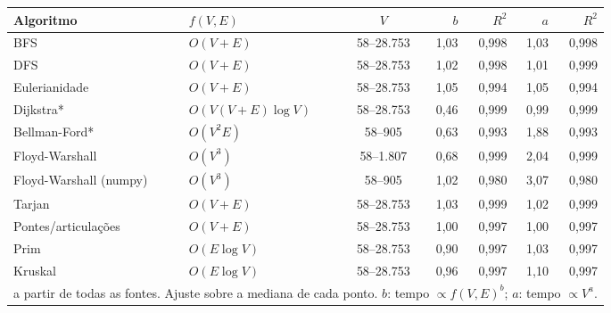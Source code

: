 \begin{tabular}{llcrrrr}
  \toprule
  Algoritmo & $f(V,E)$ & $V$ & $b$ & $R^2$ & $a$ & $R^2$ \\
  \midrule
  BFS & $O(V+E)$ & 58--28.753 & 1,03 & 0,998 & 1,03 & 0,998 \\
  DFS & $O(V+E)$ & 58--28.753 & 1,02 & 0,998 & 1,01 & 0,999 \\
  Eulerianidade & $O(V+E)$ & 58--28.753 & 1,05 & 0,994 & 1,05 & 0,994 \\
  Dijkstra* & $O(V(V+E)\log V)$ & 58--28.753 & 0,46 & 0,999 & 0,99 & 0,999 \\
  Bellman-Ford* & $O(V^2E)$ & 58--905 & 0,63 & 0,993 & 1,88 & 0,993 \\
  Floyd-Warshall & $O(V^3)$ & 58--1.807 & 0,68 & 0,999 & 2,04 & 0,999 \\
  Floyd-Warshall (numpy) & $O(V^3)$ & 58--905 & 1,02 & 0,980 & 3,07 & 0,980 \\
  Tarjan & $O(V+E)$ & 58--28.753 & 1,03 & 0,999 & 1,02 & 0,999 \\
  Pontes/articulações & $O(V+E)$ & 58--28.753 & 1,00 & 0,997 & 1,00 & 0,997 \\
  Prim & $O(E\log V)$ & 58--28.753 & 0,90 & 0,997 & 1,03 & 0,997 \\
  Kruskal & $O(E\log V)$ & 58--28.753 & 0,96 & 0,997 & 1,10 & 0,997 \\
  \bottomrule
  \multicolumn{7}{l}{\footnotesize * a partir de todas as fontes. Ajuste sobre a mediana de cada ponto. $b$: tempo $\propto f(V,E)^b$; $a$: tempo $\propto V^a$.} \\
\end{tabular}
